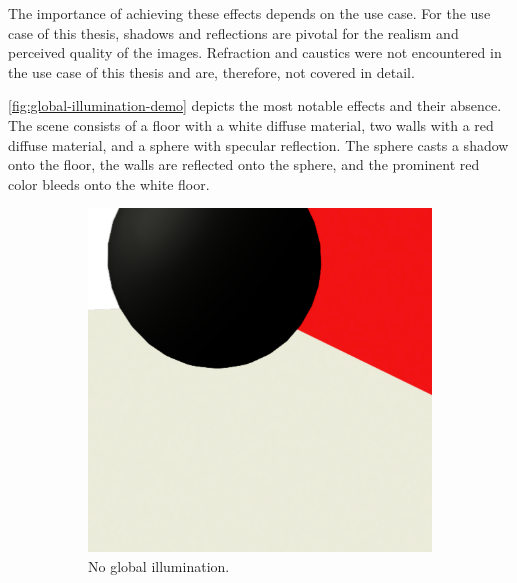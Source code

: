 The importance of achieving these effects depends on the use case. For the use case of this thesis, shadows and reflections are pivotal for the realism and perceived quality of the images. Refraction and caustics were not encountered in the use case of this thesis and are, therefore, not covered in detail.

\autoref{fig:global-illumination-demo} depicts the most notable effects and their absence. The scene consists of a floor with a white diffuse material, two walls with a red diffuse material, and a sphere with specular reflection. The sphere casts a shadow onto the floor, the walls are reflected onto the sphere, and the prominent red color bleeds onto the white floor.

\begin{figure}[H]
  \centering
  \hspace*{1.8cm}
  \begin{subfigure}[b]{0.3\textwidth}
    \centering
    \includegraphics[width=\textwidth]{resources/global-illumination-demonstration-negative.png}
    \caption{No global illumination.}
    \label{fig:global-illumination-demo-bad}
  \end{subfigure}
  \hfill
  \begin{subfigure}[b]{0.3\textwidth}
    \centering

\end{subfigure}
\end{figure}
